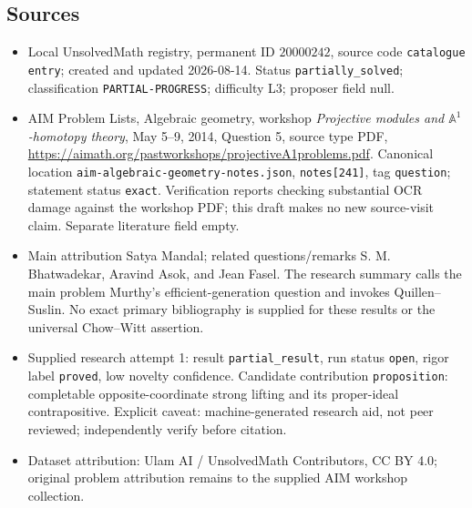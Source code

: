 \documentclass[11pt]{article}
\newcommand{\A}{\mathbb{A}}
\begin{document}
\subsection{Sources}
\begin{itemize}
\item Local UnsolvedMath registry, permanent ID $20000242$, source code \texttt{catalogue entry}; created and updated 2026-08-14. Status \texttt{partially\_solved}; classification \texttt{PARTIAL-PROGRESS}; difficulty L3; proposer field null.
\item AIM Problem Lists, Algebraic geometry, workshop \emph{Projective modules and $\A^1$-homotopy theory}, May 5--9, 2014, Question 5, source type PDF, \url{https://aimath.org/pastworkshops/projectiveA1problems.pdf}. Canonical location \texttt{aim-algebraic-geometry-notes.json}, \texttt{notes[241]}, tag \texttt{question}; statement status \texttt{exact}. Verification reports checking substantial OCR damage against the workshop PDF; this draft makes no new source-visit claim. Separate literature field empty.
\item Main attribution Satya Mandal; related questions/remarks S. M. Bhatwadekar, Aravind Asok, and Jean Fasel. The research summary calls the main problem Murthy's efficient-generation question and invokes Quillen--Suslin. No exact primary bibliography is supplied for these results or the universal Chow--Witt assertion.
\item Supplied research attempt 1: result \texttt{partial\_result}, run status \texttt{open}, rigor label \texttt{proved}, low novelty confidence. Candidate contribution \texttt{proposition}: completable opposite-coordinate strong lifting and its proper-ideal contrapositive. Explicit caveat: machine-generated research aid, not peer reviewed; independently verify before citation.
\item Dataset attribution: Ulam AI / UnsolvedMath Contributors, CC BY 4.0; original problem attribution remains to the supplied AIM workshop collection.
\end{itemize}
\end{document}
